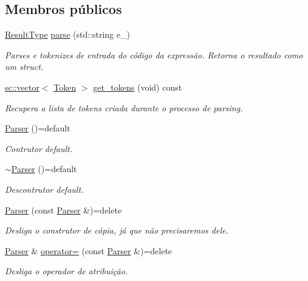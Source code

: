 \subsection*{Membros públicos}
\begin{DoxyCompactItemize}
\item 
\hyperlink{structParser_1_1ResultType}{Result\+Type} \hyperlink{classParser_a0ae862fb78eb349777532c6d120d0d25}{parse} (std\+::string e\+\_\+)
\begin{DoxyCompactList}\small\item\em Parses e tokenizes de entrada do código da expressão. Retorna o resultado como um struct. \end{DoxyCompactList}\item 
\hyperlink{classsc_1_1vector}{sc\+::vector}$<$ \hyperlink{structToken}{Token} $>$ \hyperlink{classParser_a4cd9c7937197721f850eabb3a2178ced}{get\+\_\+tokens} (void) const
\begin{DoxyCompactList}\small\item\em Recupera a lista de tokens criada durante o processo de parsing. \end{DoxyCompactList}\item 
\hyperlink{classParser_a5208129b497bfdf7c8ecceeb70e4bba8}{Parser} ()=default
\begin{DoxyCompactList}\small\item\em Contrutor default. \end{DoxyCompactList}\item 
\hyperlink{classParser_a95734193a58a199b4c6d820a6a730c42}{$\sim$\+Parser} ()=default
\begin{DoxyCompactList}\small\item\em Descontrutor default. \end{DoxyCompactList}\item 
\hyperlink{classParser_a48044a8caa14a251cb4dad9fb363658e}{Parser} (const \hyperlink{classParser}{Parser} \&)=delete
\begin{DoxyCompactList}\small\item\em Desliga o construtor de cópia, já que não precisaremos dele. \end{DoxyCompactList}\item 
\hyperlink{classParser}{Parser} \& \hyperlink{classParser_aa47e7e93b8d1ff76c51ce3028ff24ce6}{operator=} (const \hyperlink{classParser}{Parser} \&)=delete
\begin{DoxyCompactList}\small\item\em Desliga o operador de atribuição. \end{DoxyCompactList}\end{DoxyCompactItemize}

